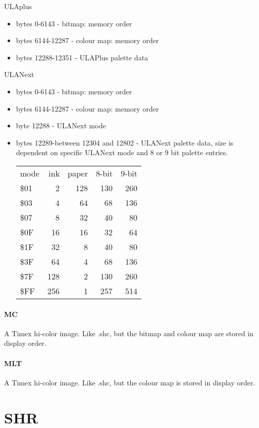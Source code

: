 ULAplus
\begin{itemize}
\item bytes 0-6143 - bitmap: memory order
\item bytes 6144-12287 - colour map: memory order
\item bytes 12288-12351 - ULAPlus palette data
\end{itemize}
ULANext
\begin{itemize}
\item bytes 0-6143 - bitmap: memory order
\item bytes 6144-12287 - colour map: memory order
\item byte 12288 - ULANext mode
\item bytes 12289-between 12304 and 12802 - ULANext palette data, size
  is dependent on specific ULANext mode and 8 or 9 bit palette entries.

  \begin{center}
    \begin{tabular}{l | r | r | r | r}
      mode & ink & paper & 8-bit & 9-bit \\
      \$01 & 2 & 128 & 130 & 260\\
      \$03 & 4 & 64 & 68 & 136\\
      \$07 & 8 & 32 & 40 & 80\\
      \$0F & 16 & 16 & 32 & 64\\
      \$1F & 32 & 8 & 40 & 80\\
      \$3F & 64 & 4 & 68 & 136\\
      \$7F & 128 & 2 & 130 & 260\\
      \$FF & 256 & 1 & 257 & 514
    \end{tabular}
  \end{center}
\end{itemize}

\paragraph{MC}
A Timex hi-color image. Like .shc, but the bitmap and colour map are
stored in display order.

\paragraph{MLT}
A Timex hi-color image. Like .shc, but the colour map is stored in
display order.

\section{SHR}
  
